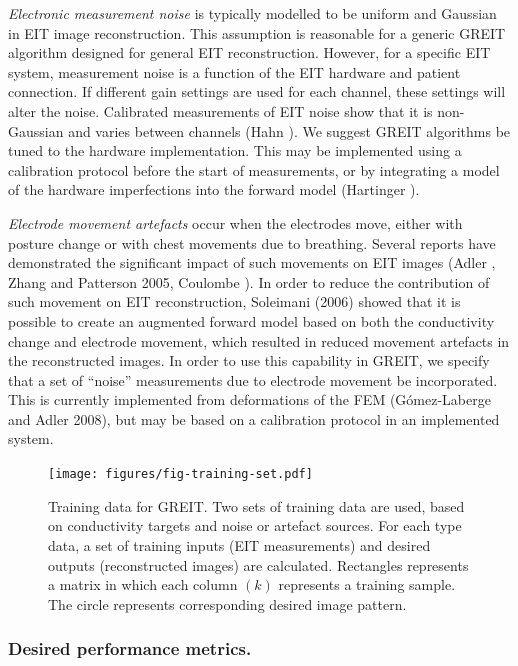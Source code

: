 \documentclass[12pt]{iopart}
\begin{document}
{\em Electronic measurement noise}
is typically modelled to be uniform and Gaussian in EIT
image reconstruction. This assumption is reasonable for
a generic GREIT algorithm designed for general EIT reconstruction.
However, for a specific EIT system, measurement noise
is a function of the EIT hardware and patient
connection. If different gain settings are used for each
channel, these settings will alter the noise. Calibrated
measurements of EIT noise show that it is non-Gaussian and
varies between channels (Hahn ).
 We suggest GREIT algorithms
be tuned to the hardware implementation. This may be 
implemented using a calibration protocol before the 
start of measurements, or by integrating a model of 
the hardware imperfections into the forward model
(Hartinger ).

{\em Electrode movement artefacts}
occur when the electrodes move, either with posture change
or with chest movements due to breathing. Several reports
have demonstrated the significant impact of such movements on
EIT images (Adler , Zhang and Patterson 2005,
Coulombe ). In order to reduce the contribution
of such movement on EIT reconstruction, Soleimani \etal
(2006) showed that it is possible to create an
augmented forward model based on both the conductivity change
and electrode movement, which resulted in reduced movement 
artefacts in the reconstructed images. In order
to use this capability in GREIT, we specify that a
set of ``noise'' measurements due to electrode movement 
be incorporated. This is currently implemented from
deformations of the FEM (G\'omez-Laberge and Adler 2008),
but may be based on a calibration protocol in an
implemented system.

\begin{figure}[bhtp]
\begin{center}
\texttt{[image: figures/fig-training-set.pdf]}
\caption{ \label{fig:desired_performance}
Training data for GREIT. Two sets of training data are used, based on
conductivity targets and noise or artefact sources. For each type
data, a set of training inputs (EIT measurements) and desired
outputs (reconstructed images) are calculated. Rectangles represents
a matrix in which each column $(k)$ represents a training
sample. The circle represents corresponding desired image pattern.
}
\end{center}
\end{figure}

 
\subsubsection{Desired performance metrics.}
\end{document}
